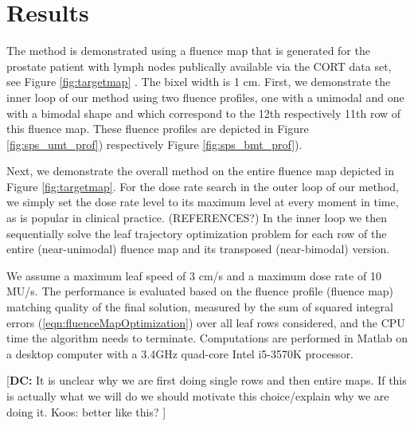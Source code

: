 \documentclass{iopart}
\newcommand{\DCcomment}[1]{{\color{magenta}\par {[{\bf DC: } { #1}} ] \\    }}
\begin{document}
\section{Results}
The method is demonstrated using a fluence map that is generated for the prostate patient with lymph nodes publically available via the CORT data set, see Figure \ref{fig:targetmap} \cite{CORT14}.
The bixel width is 1 cm.
First, we demonstrate the inner loop of our method using two fluence profiles, one with a unimodal and one with a bimodal shape and which correspond to the 12th respectively 11th row of this fluence map. 
These fluence profiles are depicted in Figure \ref{fig:sps_umt_prof}) respectively Figure \ref{fig:sps_bmt_prof}).


Next, we demonstrate the overall method on the entire fluence map depicted in Figure \ref{fig:targetmap}.
For the dose rate search in the outer loop of our method, we simply set the dose rate level to its maximum level at every moment in time, as is popular in clinical practice. (REFERENCES?)
In the inner loop we then sequentially solve the leaf trajectory optimization problem for each row of the entire (near-unimodal) fluence map and its transposed (near-bimodal) version. 

We assume a maximum leaf speed of 3 cm/s and a maximum dose rate of 10 MU/s. 
The performance is evaluated based on the fluence profile (fluence map) matching quality of the final solution, measured by the sum of squared integral errors (\ref{eqn:fluenceMapOptimization}) over all leaf rows considered, and the CPU time the algorithm needs to terminate.
Computations are performed in Matlab on a desktop computer with a 3.4GHz quad-core Intel i5-3570K processor.

\DCcomment{It is unclear why we are first doing single rows and then entire maps. If this is actually what we will do we should motivate this choice/explain why we are doing it. Koos: better like this?}
\end{document}
